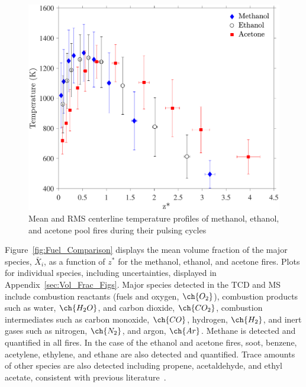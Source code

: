 \documentclass[12pt]{article}
\begin{document}
\begin{figure}[h!]
	\centering
\includegraphics[width=11.0 cm, keepaspectratio]{Temperature_Comparison.pdf}
	\caption[Mean and RMS centerline temperature profiles]{Mean and RMS centerline temperature profiles of methanol, ethanol, and acetone pool fires during their pulsing cycles}
	\label{fig:Temp_Comparison}
\end{figure}

Figure~\ref{fig:Fuel_Comparison} displays the mean volume fraction of the major species, $\bar{X}_{i}$, as a function of $z^*$ for the methanol, ethanol, and acetone fires. Plots for individual species, including uncertainties, displayed in Appendix~\ref{sec:Vol_Frac_Figs}. Major species detected in the TCD and MS include combustion reactants (fuels and oxygen, $\ch{O_2}$), combustion products such as water, $\ch{H_{2}O}$, and carbon dioxide, $\ch{CO_{2}}$, combustion intermediates such as carbon monoxide, $\ch{CO}$, hydrogen, $\ch{H_{2}}$, and inert gases such as nitrogen, $\ch{N_{2}}$, and argon, $\ch{Ar}$. Methane is detected and quantified in all fires. In the case of the ethanol and acetone fires, soot, benzene, acetylene, ethylene, and ethane are also detected and quantified. Trace amounts of other species are also detected including propene, acetaldehyde, and ethyl acetate, consistent with previous literature~\cite{Pichon2009, Gong2015}.
\end{document}
